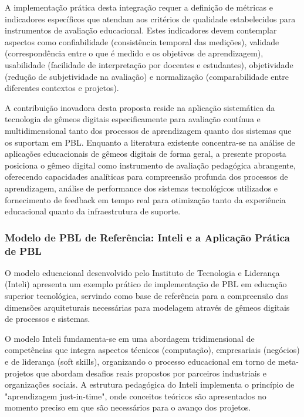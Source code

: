 \documentclass[12pt,a4paper]{article}
\begin{document}
A implementação prática desta integração requer a definição de métricas e indicadores específicos que atendam aos critérios de qualidade estabelecidos para instrumentos de avaliação educacional. Estes indicadores devem contemplar aspectos como confiabilidade (consistência temporal das medições), validade (correspondência entre o que é medido e os objetivos de aprendizagem), usabilidade (facilidade de interpretação por docentes e estudantes), objetividade (redução de subjetividade na avaliação) e normalização (comparabilidade entre diferentes contextos e projetos).

A contribuição inovadora desta proposta reside na aplicação sistemática da tecnologia de gêmeos digitais especificamente para avaliação contínua e multidimensional tanto dos processos de aprendizagem quanto dos sistemas que os suportam em PBL. Enquanto a literatura existente \cite{bachmann2023} concentra-se na análise de aplicações educacionais de gêmeos digitais de forma geral, a presente proposta posiciona o gêmeo digital como instrumento de avaliação pedagógica abrangente, oferecendo capacidades analíticas para compreensão profunda dos processos de aprendizagem, análise de performance dos sistemas tecnológicos utilizados e fornecimento de feedback em tempo real para otimização tanto da experiência educacional quanto da infraestrutura de suporte.

\subsubsection{Modelo de PBL de Referência: Inteli e a Aplicação Prática de PBL}

O modelo educacional desenvolvido pelo Instituto de Tecnologia e Liderança (Inteli) \cite{inteli2024} apresenta um exemplo prático de implementação de PBL em educação superior tecnológica, servindo como base de referência para a compreensão das dimensões arquiteturais necessárias para modelagem através de gêmeos digitais de processos e sistemas.

O modelo Inteli fundamenta-se em uma abordagem tridimensional de competências que integra aspectos técnicos (computação), empresariais (negócios) e de liderança (soft skills), organizando o processo educacional em torno de meta-projetos que abordam desafios reais propostos por parceiros industriais e organizações sociais. A estrutura pedagógica do Inteli implementa o princípio de "aprendizagem just-in-time", onde conceitos teóricos são apresentados no momento preciso em que são necessários para o avanço dos projetos.
\end{document}
